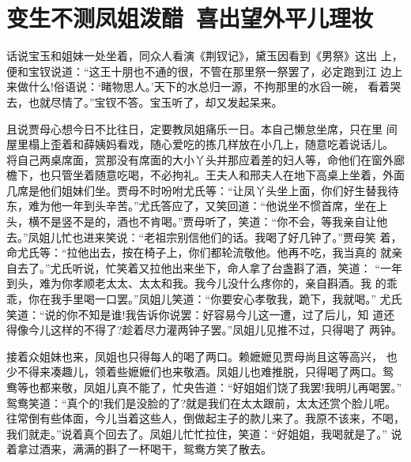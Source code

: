 \chapter{变生不测凤姐泼醋~喜出望外平儿理妆}

话说宝玉和姐妹一处坐着，同众人看演《荆钗记》，黛玉因看到《男祭》这出
上，便和宝钗说道：“这王十朋也不通的很，不管在那里祭一祭罢了，必定跑到江
边上来做什么!俗语说：‘睹物思人。’天下的水总归一源，不拘那里的水舀一碗，
看着哭去，也就尽情了。”宝钗不答。宝玉听了，却又发起呆来。

且说贾母心想今日不比往日，定要教凤姐痛乐一日。本自己懒怠坐席，只在里
间屋里榻上歪着和薛姨妈看戏，随心爱吃的拣几样放在小几上，随意吃着说话儿。
将自己两桌席面，赏那没有席面的大小丫头并那应着差的妇人等，命他们在窗外廊
檐下，也只管坐着随意吃喝，不必拘礼。王夫人和邢夫人在地下高桌上坐着，外面
几席是他们姐妹们坐。贾母不时吩咐尤氏等：“让凤丫头坐上面，你们好生替我待
东，难为他一年到头辛苦。”尤氏答应了，又笑回道：“他说坐不惯首席，坐在上
头，横不是竖不是的，酒也不肯喝。”贾母听了，笑道：“你不会，等我亲自让他
去。”凤姐儿忙也进来笑说：“老祖宗别信他们的话。我喝了好几钟了。”贾母笑
着，命尤氏等：“拉他出去，按在椅子上，你们都轮流敬他。他再不吃，我当真的
就亲自去了。”尤氏听说，忙笑着又拉他出来坐下，命人拿了台盏斟了酒，笑道：
“一年到头，难为你孝顺老太太、太太和我。我今儿没什么疼你的，亲自斟酒。我
的乖乖，你在我手里喝一口罢。”凤姐儿笑道：“你要安心孝敬我，跪下，我就喝。”
尤氏笑道：“说的你不知是谁!我告诉你说罢：好容易今儿这一遭，过了后儿，知
道还得像今儿这样的不得了?趁着尽力灌两钟子罢。”凤姐儿见推不过，只得喝了
两钟。

接着众姐妹也来，凤姐也只得每人的喝了两口。赖嬷嬷见贾母尚且这等高兴，
也少不得来凑趣儿，领着些嬷嬷们也来敬酒。凤姐儿也难推脱，只得喝了两口。鸳
鸯等也都来敬，凤姐儿真不能了，忙央告道：“好姐姐们饶了我罢!我明儿再喝罢。”
鸳鸯笑道：“真个的!我们是没脸的了?就是我们在太太跟前，太太还赏个脸儿呢。
往常倒有些体面，今儿当着这些人，倒做起主子的款儿来了。我原不该来，不喝，
我们就走。”说着真个回去了。凤姐儿忙忙拉住，笑道：“好姐姐，我喝就是了。”
说着拿过酒来，满满的斟了一杯喝干，鸳鸯方笑了散去。

